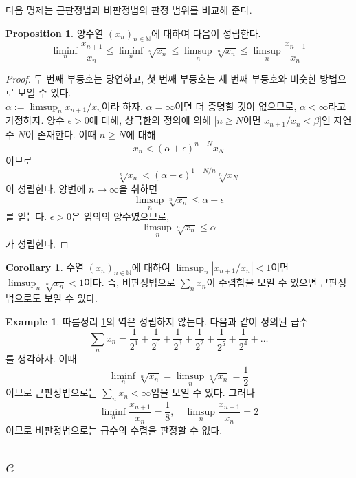 \documentclass[11pt]{book}
\numberwithin{equation}{chapter}
\def\NN{\mathbb{N}}
\def\eps{\epsilon}
\newcommand{\abs}[1]{\left\vert#1\right\vert}
\theoremstyle{definition}
\newtheorem{cor}[thm]{Corollary}
\newtheorem{prop}[thm]{Proposition}
\newtheorem*{ex}{Example}
\begin{document}
다음 명제는 근판정법과 비판정법의 판정 범위를 비교해 준다.

\begin{prop}
    양수열 \((x_n)_{n \in \NN}\)에 대하여 다음이 성립한다.
    \[
    \liminf_n \frac{x_{n+1}}{x_n} \le \liminf_n \sqrt[n]{x_n} \le \limsup_n \sqrt[n]{x_n} \le \limsup_n \frac{x_{n+1}}{x_n}    
    \]
\end{prop}
\begin{proof}
    두 번째 부등호는 당연하고, 첫 번째 부등호는 세 번째 부등호와 비슷한 방법으로 보일 수 있다.\\
    \(\alpha := \limsup_n x_{n+1} / x_n\)이라 하자. \(\alpha = \infty\)이면 더 증명할 것이 없으므로, \(\alpha < \infty\)라고 가정하자. 양수 \(\eps > 0\)에 대해, 상극한의 정의에 의해 [\(n \ge N\)이면 \(x_{n+1} / x_n < \beta\)]인 자연수 \(N\)이 존재한다. 이때 \(n \ge N\)에 대해
    \[
    x_n < (\alpha + \eps)^{n-N} x_N
    \]
    이므로
    \[
    \sqrt[n]{x_n} < (\alpha + \eps)^{1 - N/n} \sqrt[n]{x_N}    
    \]
    이 성립한다. 양변에 \(n \to \infty\)을 취하면
    \[
    \limsup_n \sqrt[n]{x_n} \le \alpha + \eps
    \]
    를 얻는다. \(\eps > 0\)은 임의의 양수였으므로,
    \[
        \limsup_n \sqrt[n]{x_n} \le \alpha
    \]
    가 성립한다.
\end{proof}

\begin{cor} \label{cor 5.5.4}
    수열 \((x_n)_{n \in \NN}\)에 대하여 \(\limsup_n \abs{x_{n+1} / x_n} < 1\)이면 \(\limsup_n \sqrt[n]{x_n} < 1\)이다. 즉, 비판정법으로 \(\sum_n x_n\)이 수렴함을 보일 수 있으면 근판정법으로도 보일 수 있다.
\end{cor}

\begin{ex}
    따름정리 \ref{cor 5.5.4}의 역은 성립하지 않는다. 다음과 같이 정의된 급수
    \[
    \sum_n x_n = \frac{1}{2^1} + \frac{1}{2^0} + \frac{1}{2^3} + \frac{1}{2^2} + \frac{1}{2^5} + \frac{1}{2^4} + \ldots    
    \]
    를 생각하자. 이때
    \[
    \liminf_n \sqrt[n]{x_n} = \limsup_n \sqrt[n]{x_n} = \frac{1}{2}    
    \]
    이므로 근판정법으로는 \(\sum_n x_n < \infty\)임을 보일 수 있다. 그러나
    \[
        \liminf_n \frac{x_{n+1}}{x_n} = \frac{1}{8}, \quad \limsup_n \frac{x_{n+1}}{x_n} = 2
    \]
    이므로 비판정법으로는 급수의 수렴을 판정할 수 없다. 
\end{ex}

\section{\(e\)}
\end{document}

